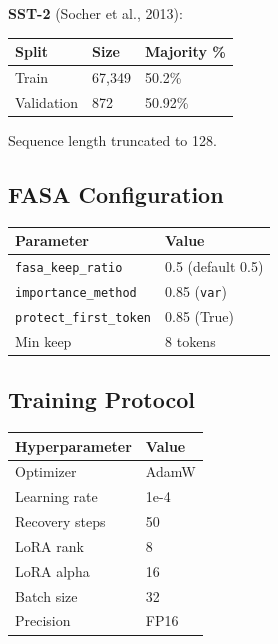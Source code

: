 \textbf{SST-2} (Socher et al., 2013):

\begin{table}[H]
\centering
\small
\begin{tabular}{lll}
\toprule
\textbf{Split} & \textbf{Size} & \textbf{Majority \%} \\
\midrule
Train & 67,349 & 50.2\% \\
Validation & 872 & 50.92\% \\
\bottomrule
\end{tabular}
\end{table}

Sequence length truncated to 128.

\subsection{FASA Configuration}

\begin{table}[H]
\centering
\small
\begin{tabular}{ll}
\toprule
\textbf{Parameter} & \textbf{Value} \\
\midrule
\texttt{fasa\_keep\_ratio} & 0.5 (default 0.5) \\
\texttt{importance\_method} & 0.85 (\texttt{var}) \\
\texttt{protect\_first\_token} & 0.85 (True) \\
Min keep & 8 tokens \\
\bottomrule
\end{tabular}
\end{table}

\subsection{Training Protocol}

\begin{table}[H]
\centering
\small
\begin{tabular}{ll}
\toprule
\textbf{Hyperparameter} & \textbf{Value} \\
\midrule
Optimizer & AdamW \\
Learning rate & 1e-4 \\
Recovery steps & 50 \\
LoRA rank & 8 \\
LoRA alpha & 16 \\
Batch size & 32 \\
Precision & FP16 \\
\bottomrule
\end{tabular}
\end{table}

